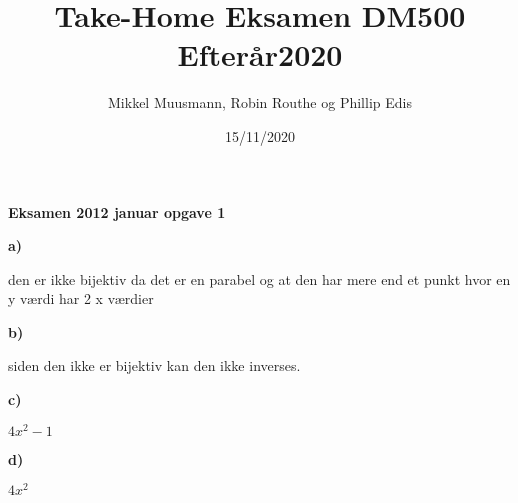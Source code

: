\documentclass{article}
\title{\textbf{Take-Home Eksamen DM500 Efterår2020}}
\author{Mikkel Muusmann, Robin Routhe og Phillip Edis}
\date{15/11/2020}
\begin{document}
\maketitle

\textbf{Eksamen 2012 januar opgave 1}

\textbf{a)}

den er ikke bijektiv da det er en parabel og at den har mere end et punkt
hvor en y værdi har 2 x værdier 

\textbf{b)}

siden den ikke er bijektiv kan den ikke inverses.

\textbf{c)}

$4x^2-1$

\textbf{d)}

$4x^2$
\end{document}
